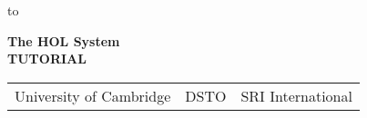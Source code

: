 

\begin{titlepage}
\null\vskip-47pt
\hbox to 

\setcounter{page}{1}                      %

\vspace*{60mm}


\begin{center}
 {\Huge\bf The HOL System}\\[0.4cm]
{\LARGE\bf TUTORIAL}\\[2.5cm]
\end{center}


\vspace*{100mm}
\begin{center}
\begin{tabular}{ccc}
University of Cambridge & \hspace*{10ex}DSTO\hspace*{10ex} & SRI International
\end{tabular}

\end{center}

\vfill
\end{titlepage}

\thispagestyle{empty}
\mbox{}
\newpage


